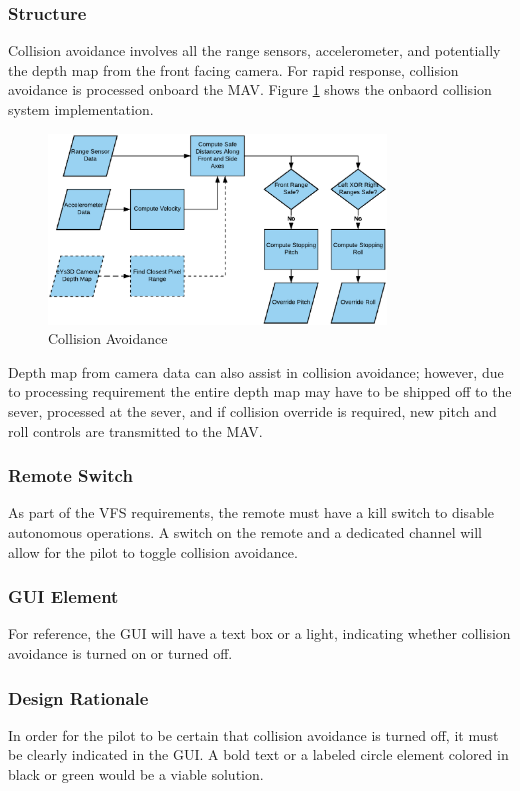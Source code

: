 \documentclass[onecolumn, draftclsnofoot, 10pt, compsoc]{IEEEtran}
\begin{document}
\subsubsection{Structure}
Collision avoidance involves all the range sensors, accelerometer, and potentially the depth map from the front facing camera. For rapid response, collision avoidance is processed onboard the MAV. Figure \ref{fig:ColAvo} shows the onbaord collision system implementation.
\begin{figure}[h]
    \centering
    \includegraphics[width=0.8\textwidth]{graphics/collision_avoidance.eps}
    \caption{Collision Avoidance}
    \label{fig:ColAvo}
\end{figure}

Depth map from camera data can also assist in collision avoidance; however, due to processing requirement the entire depth map may have to be shipped off to the sever, processed at the sever, and if collision override is required, new pitch and roll controls are transmitted to the MAV.

\subsubsection{Remote Switch}
As part of the VFS requirements, the remote must have a kill switch to disable autonomous operations. A switch on the remote and a dedicated channel will allow for the pilot to toggle collision avoidance.

\subsubsection{GUI Element}
For reference, the GUI will have a text box or a light, indicating whether collision avoidance is turned on or turned off.

\subsubsection{Design Rationale}
In order for the pilot to be certain that collision avoidance is turned off, it must be clearly indicated in the GUI. A bold text or a labeled circle element colored in black or green would be a viable solution.
\end{document}
